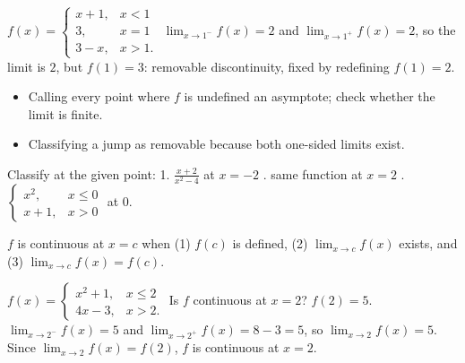 \begin{example}
$f(x)=\begin{cases}x+1, & x<1\\ 3, & x=1\\ 3-x, & x>1.\end{cases}$
\sol $\lim_{x\to1^-}f(x)=2$ and $\lim_{x\to1^+}f(x)=2$, so the limit is $2$, but $f(1)=3$: removable discontinuity, fixed by redefining $f(1)=2$.
\end{example}

\begin{mistakes}
\begin{itemize}
\item Calling every point where $f$ is undefined an asymptote; check whether the limit is finite.
\item Classifying a jump as removable because both one-sided limits exist.
\end{itemize}
\end{mistakes}

\begin{quickcheck}
Classify at the given point: 1. $\frac{x+2}{x^2-4}$ at $x=-2$ . same function at $x=2$ . $\begin{cases}x^2,&x\le0\\x+1,&x>0\end{cases}$ at $0$.
\end{quickcheck}


\begin{keyidea}[Definition]
$f$ is continuous at $x=c$ when (1) $f(c)$ is defined, (2) $\lim_{x\to c}f(x)$ exists, and (3) $\lim_{x\to c}f(x)=f(c)$.
\end{keyidea}

\begin{example}
$f(x)=\begin{cases}x^2+1, & x\le2\\ 4x-3, & x>2.\end{cases}$ Is $f$ continuous at $x=2$?
\sol $f(2)=5$. $\lim_{x\to2^-}f(x)=5$ and $\lim_{x\to2^+}f(x)=8-3=5$, so $\lim_{x\to2}f(x)=5$. Since $\lim_{x\to2}f(x)=f(2)$, $f$ is continuous at $x=2$.
\end{example}

